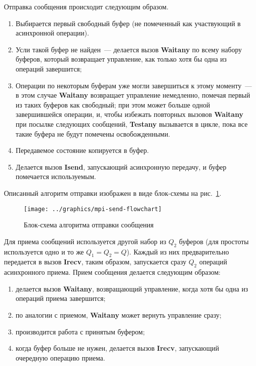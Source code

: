 \documentclass[12pt,a4paper,fleqn]{article}
\newcommand{\Code}[1]{\textbf{\mbox{#1}}}
\begin{document}
Отправка сообщения происходит следующим образом.
\begin{enumerate}
\item Выбирается первый свободный буфер (не помеченный как участвующий в асинхронной
  операции).
\item Усли такой буфер не найден~--- делается вызов \Code{Waitany} по всему набору
  буферов, который возвращает управление, как только хотя бы одна из операций завершится;
\item Операции по некоторым буферам уже могли завершиться к этому моменту~--- в этом
  случае \Code{Waitany} возвращает управление немедленно, помечая первый из таких буферов
  как свободный; при этом может больше одной завершившейся операции, и, чтобы избежать
  повторных вызовов \Code{Waitany} при посылке следующих сообщений, \Code{Testany}
  вызывается в цикле, пока все такие буфера не будут помечены освобожденными.
\item Передавемое состояние копируется в буфер.
\item Делается вызов \Code{Isend}, запускающий асинхронную передачу, и буфер помечается
  используемым.
\end{enumerate}

Описанный алгоритм отправки изображен в виде блок-схемы на рис.~\ref{fig:mpi-send-flowchart}.

\begin{figure}[!tb]
  \centering
  \texttt{[image: ../graphics/mpi-send-flowchart]}
  \caption{Блок-схема алгоритма отправки сообщения}
  \label{fig:mpi-send-flowchart}
\end{figure}

Для приема сообщений используется другой набор из $Q_2$ буферов (для простоты используется
одно и то же $Q_1 = Q_2 = Q$). Каждый из них предварительно передается в вызов
\Code{Irecv}, таким образом, запускается сразу $Q_2$ операций асинхронного приема. Прием
сообщения делается следующим образом:
\begin{enumerate}
\item делается вызов \Code{Waitany}, возвращающий управление, когда хотя бы одна из
  операций приема завершится;
\item по аналогии с приемом, \Code{Waitany} может вернуть управление сразу;
\item производится работа с принятым буфером;
\item когда буфер больше не нужен, делается вызов \Code{Irecv}, запускающий очередную
  операцию приема.
\end{enumerate}
\end{document}

